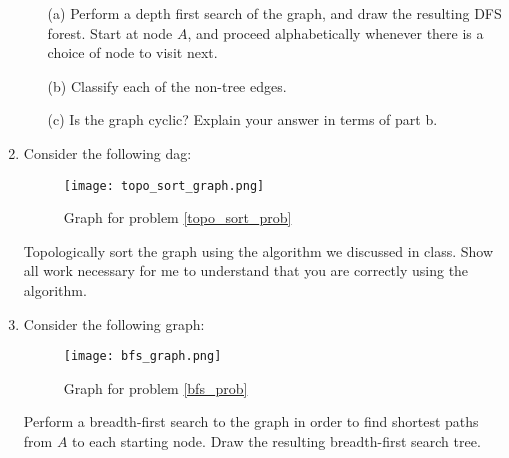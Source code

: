 \documentclass[12pt]{article}
\begin{document}
\begin{enumerate}
    \begin{itemize}
        \item[(a)] Perform a depth first search of the graph, and draw the resulting DFS forest. Start at node $A$, and proceed alphabetically whenever there is a choice of node to visit next. 
        \item[(b)] Classify each of the non-tree edges.  
        \item[(c)] Is the graph cyclic? Explain your answer in terms of part b. 
    \end{itemize}
    \label{dfs_prob}
    \newpage
    \item Consider the following dag:
    \begin{figure}[h]
        \centering
        \caption{Graph for problem \ref{topo_sort_prob}}
        \texttt{[image: topo\_sort\_graph.png]}
    \end{figure}
    Topologically sort the graph using the algorithm we discussed in class. Show all work necessary for me to understand that you are correctly using the algorithm. 
    \label{topo_sort_prob}
    \newpage
    \item Consider the following graph: \label{bfs}
    \begin{figure}[h]
        \centering
        \caption{Graph for problem \ref{bfs_prob}}
        \texttt{[image: bfs\_graph.png]}
    \end{figure}
     Perform a breadth-first search to the graph in order to find shortest paths from $A$ to each starting node. Draw the resulting breadth-first search tree.


\end{enumerate}
\end{document}
